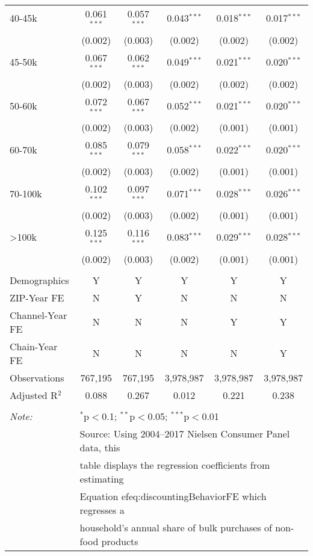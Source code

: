 \begin{table}[!htbp]
\begin{tabular}{@{\extracolsep{5pt}}lccccc}
  40-45k & 0.061$^{***}$ & 0.057$^{***}$ & 0.043$^{***}$ & 0.018$^{***}$ & 0.017$^{***}$ \\ 
  & (0.002) & (0.003) & (0.002) & (0.002) & (0.002) \\ 
  45-50k & 0.067$^{***}$ & 0.062$^{***}$ & 0.049$^{***}$ & 0.021$^{***}$ & 0.020$^{***}$ \\ 
  & (0.002) & (0.003) & (0.002) & (0.002) & (0.002) \\ 
  50-60k & 0.072$^{***}$ & 0.067$^{***}$ & 0.052$^{***}$ & 0.021$^{***}$ & 0.020$^{***}$ \\ 
  & (0.002) & (0.003) & (0.002) & (0.001) & (0.001) \\ 
  60-70k & 0.085$^{***}$ & 0.079$^{***}$ & 0.058$^{***}$ & 0.022$^{***}$ & 0.020$^{***}$ \\ 
  & (0.002) & (0.003) & (0.002) & (0.001) & (0.001) \\ 
  70-100k & 0.102$^{***}$ & 0.097$^{***}$ & 0.071$^{***}$ & 0.028$^{***}$ & 0.026$^{***}$ \\ 
  & (0.002) & (0.003) & (0.002) & (0.001) & (0.001) \\ 
  >100k & 0.125$^{***}$ & 0.116$^{***}$ & 0.083$^{***}$ & 0.029$^{***}$ & 0.028$^{***}$ \\ 
  & (0.002) & (0.003) & (0.002) & (0.001) & (0.001) \\ 
 \hline \\[-1.8ex] 
Demographics & Y & Y & Y & Y & Y \\ 
ZIP-Year FE & N & Y & N & N & N \\ 
Channel-Year FE & N & N & N & Y & Y \\ 
Chain-Year FE & N & N & N & N & Y \\ 
Observations & 767,195 & 767,195 & 3,978,987 & 3,978,987 & 3,978,987 \\ 
Adjusted R$^{2}$ & 0.088 & 0.267 & 0.012 & 0.221 & 0.238 \\ 
\hline 
\hline \\[-1.8ex] 
\textit{Note:}  & \multicolumn{5}{l}{$^{*}$p$<$0.1; $^{**}$p$<$0.05; $^{***}$p$<$0.01} \\ 
 & \multicolumn{5}{l}{Source: Using 2004--2017 Nielsen Consumer Panel data, this } \\ 
 & \multicolumn{5}{l}{table displays the regression coefficients from estimating } \\ 
 & \multicolumn{5}{l}{Equation 
ef{eq:discountingBehaviorFE} which regresses a } \\ 
 & \multicolumn{5}{l}{household's annual share of bulk purchases of non-food products } \\ 

\end{tabular}
\end{table}
